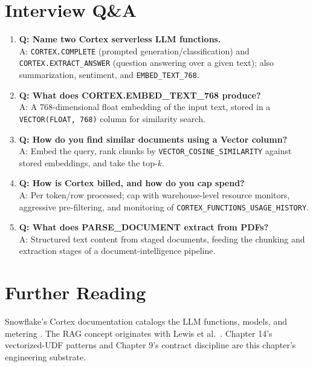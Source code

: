 \section{Interview Q\&A}
\begin{enumerate}
    \item \textbf{Q: Name two Cortex serverless LLM functions.}\\
    A: \texttt{CORTEX.COMPLETE} (prompted generation/classification) and \texttt{CORTEX.EXTRACT\_ANSWER} (question answering over a given text); also summarization, sentiment, and \texttt{EMBED\_TEXT\_768}.
    \item \textbf{Q: What does CORTEX.EMBED\_TEXT\_768 produce?}\\
    A: A 768-dimensional float embedding of the input text, stored in a \texttt{VECTOR(FLOAT, 768)} column for similarity search.
    \item \textbf{Q: How do you find similar documents using a Vector column?}\\
    A: Embed the query, rank chunks by \texttt{VECTOR\_COSINE\_SIMILARITY} against stored embeddings, and take the top-$k$.
    \item \textbf{Q: How is Cortex billed, and how do you cap spend?}\\
    A: Per token/row processed; cap with warehouse-level resource monitors, aggressive pre-filtering, and monitoring of \texttt{CORTEX\_FUNCTIONS\_USAGE\_HISTORY}.
    \item \textbf{Q: What does PARSE\_DOCUMENT extract from PDFs?}\\
    A: Structured text content from staged documents, feeding the chunking and extraction stages of a document-intelligence pipeline.
\end{enumerate}

\section{Further Reading}
Snowflake's Cortex documentation catalogs the LLM functions, models, and metering \cite{snowflakeCortexDocs}. The RAG concept originates with Lewis et al.\ \cite{lewis2020rag}. Chapter 14's vectorized-UDF patterns and Chapter 9's contract discipline are this chapter's engineering substrate.

